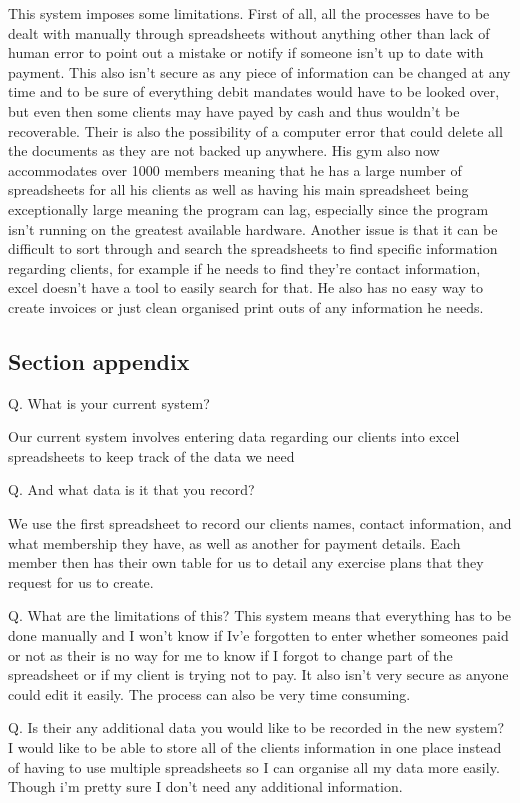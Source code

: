 This system imposes some limitations. First of all, all the processes have to be dealt with manually through spreadsheets without anything other than lack of human error to point out a mistake or notify if someone isn't up to date with payment. This also isn't secure as any piece of information can be changed at any time and to be sure of everything debit mandates would have to be looked over, but even then some clients may have payed by cash and thus wouldn't be recoverable. Their is also the possibility of a computer error that could delete all the documents as they are not backed up anywhere. His gym also now accommodates over 1000 members meaning that he has a large number of spreadsheets for all his clients as well as having his main spreadsheet being exceptionally large meaning the program can lag, especially since the program isn't running on the greatest available hardware. Another issue is that it can be difficult to sort through and search the spreadsheets to find specific information regarding clients, for example if he needs to find they're contact information, excel doesn't have a tool to easily search for that. He also has no easy way to create invoices or just clean organised print outs of any information he needs.

\subsection{Section appendix}

Q. What is your current system?

Our current system involves entering data regarding our clients into excel spreadsheets to keep track of the data we need

Q. And what data is it that you record?

We use the first spreadsheet to record our clients names, contact information, and what membership they have, as well as another for payment details. Each member then has their own table for us to detail any exercise plans that they request for us to create. 

Q. What are the limitations of this?
This system means that everything has to be done manually and I won't know if Iv'e forgotten to enter whether someones paid or not as their is no way for me to know if I forgot to change part of the spreadsheet or if my client is trying not to pay. It also isn't very secure as anyone could edit it easily. The process can also be very time consuming.

Q. Is their any additional data you would like to be recorded in the new system?
I would like to be able to store all of the clients information in one place instead of having to use multiple spreadsheets so I can organise all my data more easily. Though i'm pretty sure I don't need any additional information.

